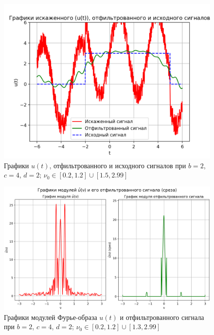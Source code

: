 \begin{figure}[ht!]
    \centering
    \includegraphics[scale=0.65]{media/1 task/specific_freq/Cleaned_2_4_2_-1,2_-0,2_-2,99_-2,7_-2,7_-1,5.png}
    \caption{Графики  $u(t)$, отфильтрованного и исходного сигналов при $b=2$, $c=4$, $d=2$; $\nu_0 \in [0.2, 1.2] \cup [1.5, 2.99]$}
    \label{fig:cleaned_2_4_2_5}
\end{figure}

\begin{figure}[ht!]
    \centering
    \includegraphics[scale=0.55]{media/1 task/specific_freq/Fourier_Image_2_4_2_-1,2_-0,2_-2,99_-2,7_-2,7_-1,3.png}
    \caption{Графики модулей Фурье-образа $u(t)$ и отфильтрованного сигнала при $b=2$, $c=4$, $d=2$; $\nu_0 \in [0.2, 1.2] \cup [1.3, 2.99]$}
    \label{fig:four_2_4_2_6}
\end{figure}

